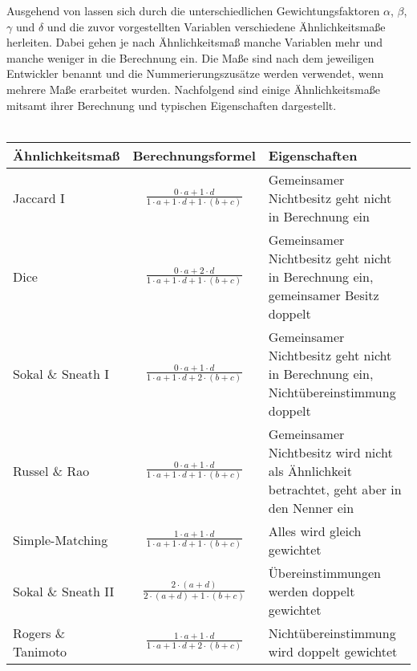 Ausgehend von \citet[S. 199/200]{Bacher.2010} lassen sich durch die unterschiedlichen Gewichtungsfaktoren $\alpha$, $\beta$, $\gamma$ und $\delta$ und die zuvor vorgestellten Variablen verschiedene \linebreak Ähnlichkeitsmaße herleiten. Dabei gehen je nach Ähnlichkeitsmaß manche Variablen mehr und manche weniger in die Berechnung ein. Die Maße sind nach dem jeweiligen Entwickler benannt und die Nummerierungszusätze werden verwendet, wenn mehrere Maße erarbeitet wurden.
Nachfolgend sind einige Ähnlichkeitsmaße mitsamt ihrer Berechnung und typischen Eigenschaften dargestellt. \\ 
\\
\begin{tabular}{|l|c|p{8cm}|}
	\hline
	\rowcolor{babyblueeyes}Ähnlichkeitsmaß & Berechnungsformel & Eigenschaften \\ \hline
	\rowcolor{beaublue}Jaccard I & $\frac{0 \cdot \textit{a} + 1 \cdot \textit{d}}{1 \cdot \textit{a} + 1 \cdot \textit{d} + 1 \cdot (\textit{b} + \textit{c})} $ & Gemeinsamer Nichtbesitz geht nicht in Berechnung ein \\ \hline
	\rowcolor{beaublue}Dice & $ \frac{0 \cdot \textit{a} + 2 \cdot \textit{d}}{1 \cdot \textit{a} + 1 \cdot \textit{d} + 1 \cdot (\textit{b} + \textit{c})} $ & Gemeinsamer Nichtbesitz geht nicht in Berechnung ein, gemeinsamer Besitz doppelt \\ \hline
	\rowcolor{beaublue}Sokal \& Sneath I & $ \frac{0 \cdot \textit{a} + 1 \cdot \textit{d}}{1 \cdot \textit{a} + 1 \cdot \textit{d} + 2 \cdot (\textit{b} + \textit{c})} $ & Gemeinsamer Nichtbesitz geht nicht in Berechnung ein, Nichtübereinstimmung doppelt \\ \hline
	\rowcolor{beaublue}Russel \& Rao & $ \frac{0 \cdot \textit{a} + 1 \cdot \textit{d}}{1 \cdot \textit{a} + 1 \cdot \textit{d} + 1 \cdot (\textit{b} + \textit{c})} $ & Gemeinsamer Nichtbesitz wird nicht als Ähnlichkeit betrachtet, geht aber in den Nenner ein \\ \hline
	\rowcolor{beaublue}Simple-Matching & $ \frac{1 \cdot \textit{a} + 1 \cdot \textit{d}}{1 \cdot \textit{a} + 1 \cdot \textit{d} + 1 \cdot (\textit{b} + \textit{c})} $ & Alles wird gleich gewichtet \\ \hline
	\rowcolor{beaublue}Sokal \& Sneath II & $ \frac{2 \cdot (\textit{a} + \textit{d})}{2 \cdot (\textit{a} + \textit{d}) + 1 \cdot (\textit{b} + \textit{c})} $ & Übereinstimmungen werden doppelt gewichtet \\ \hline
	\rowcolor{beaublue}Rogers \& Tanimoto & $ \frac{1 \cdot \textit{a} + 1 \cdot \textit{d}}{1 \cdot a + 1 \cdot \textit{d} + 2 \cdot (\textit{b} + \textit{c})} $ & Nichtübereinstimmung wird doppelt gewichtet \\ \hline
\end{tabular}

